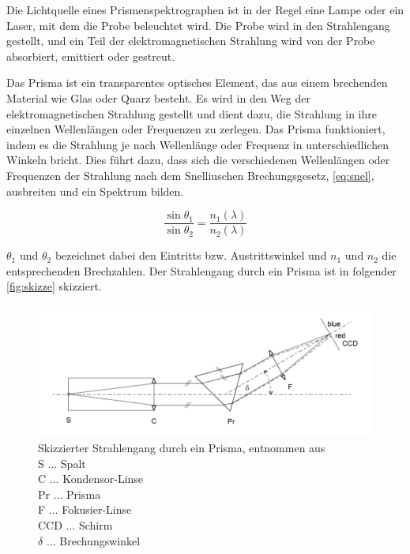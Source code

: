 \documentclass[12pt,english,ngerman]{scrartcl}
\begin{document}
Die Lichtquelle eines Prismenspektrographen ist in der Regel eine Lampe oder
ein Laser, mit dem die Probe beleuchtet wird. Die Probe wird in den
Strahlengang gestellt, und ein Teil der elektromagnetischen Strahlung wird von
der Probe absorbiert, emittiert oder gestreut.

Das Prisma ist ein transparentes optisches Element, das aus einem brechenden
Material wie Glas oder Quarz besteht. Es wird in den Weg der
elektromagnetischen Strahlung gestellt und dient dazu, die Strahlung in ihre
einzelnen Wellenlängen oder Frequenzen zu zerlegen. Das Prisma funktioniert,
indem es die Strahlung je nach Wellenlänge oder Frequenz in unterschiedlichen
Winkeln bricht. Dies führt dazu, dass sich die verschiedenen Wellenlängen oder
Frequenzen der Strahlung nach dem Snelliuschen Brechungsgesetz,
\autoref{eq:snel}, ausbreiten und ein Spektrum bilden. 

\begin{equation}
	\frac{\sin{\theta_1}}{\sin{\theta_2}} = \frac{n_1(\lambda)}{n_2(\lambda)}
	\label{eq:snel}
\end{equation}

$\theta_1$ und $\theta_2$ bezeichnet dabei den Eintritts bzw. Austrittswinkel und $n_1$ und $n_2$ die entsprechenden Brechzahlen.
Der Strahlengang durch ein Prisma ist in folgender \autoref{fig:skizze} skizziert.


\begin{figure}[H]
	\begin{center}
		\includegraphics[width =\textwidth]{./figures/skizze.png}
	\end{center}
	\caption[Skizzierter Strahlengang durch ein Prisma] {Skizzierter Strahlengang durch ein
		Prisma, entnommen aus \cite{unterlagen} \\
		S \(\dots\) Spalt                       \\
		C \(\dots\) Kondensor-Linse             \\
		Pr \(\dots\) Prisma                     \\
		F \(\dots\) Fokusier-Linse              \\
		CCD \(\dots\) Schirm                    \\
		$\delta$ \(\dots\) Brechungswinkel
	}\label{fig:skizze}
\end{figure}
\end{document}
